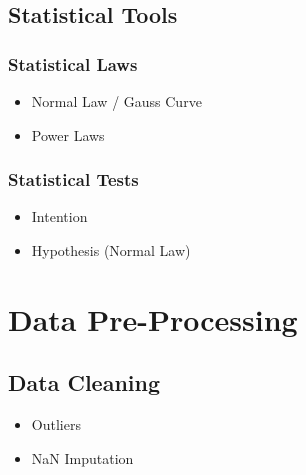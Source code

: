 \subsection{Statistical Tools}

\subsubsection{Statistical Laws}

\begin{itemize}
   \item Normal Law / Gauss Curve
   \item Power Laws
\end{itemize}


\subsubsection{Statistical Tests}

\begin{itemize}
   \item Intention
   \item Hypothesis (Normal Law)
\end{itemize}



\section{Data Pre-Processing}


\subsection{Data Cleaning}

\begin{itemize}
   \item Outliers
   \item NaN Imputation
\end{itemize}


